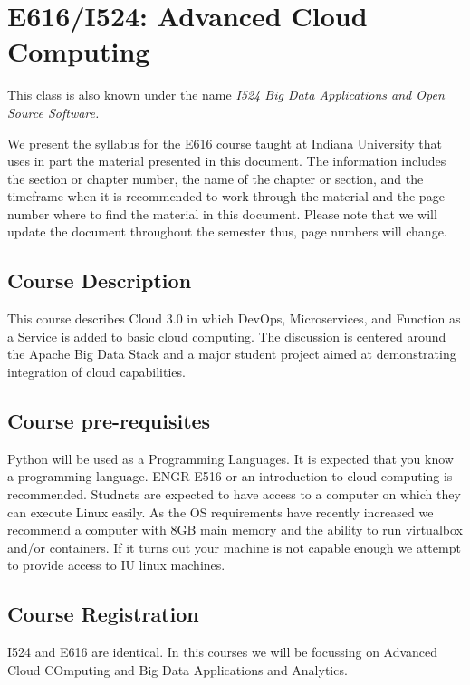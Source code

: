 \chapter{E616/I524: Advanced Cloud Computing}

This class is also known under the name \textit{I524 Big Data
Applications and Open Source Software.}
 

We present the syllabus for the E616 course taught at Indiana
University that uses in part the material presented in this
document. The information includes the section or chapter number, the
name of the chapter or section, and the timeframe when it is
recommended to work through the material and the page number where to
find the material in this document. Please note that we will update
the document throughout the semester thus, page numbers will change.

\section{Course Description }

This course describes Cloud 3.0 in which DevOps, Microservices, and
Function as a Service is added to basic cloud computing. The
discussion is centered around the Apache Big Data Stack and a major
student project aimed at demonstrating integration of cloud
capabilities.

\section{Course pre-requisites}

Python will be used as a Programming Languages. It is expected that
you know a programming language. ENGR-E516 or an introduction to cloud
computing is recommended. Studnets are expected to have access to a
computer on which they can execute Linux easily. As the OS
requirements have recently increased we recommend a computer with 8GB
main memory and the ability to run virtualbox and/or containers. If it
turns out your machine is not capable enough we attempt to provide
access to IU linux machines.

\section{Course Registration}

I524 and E616 are identical. In this courses we will be focussing on
Advanced Cloud COmputing and Big Data Applications and Analytics. 

